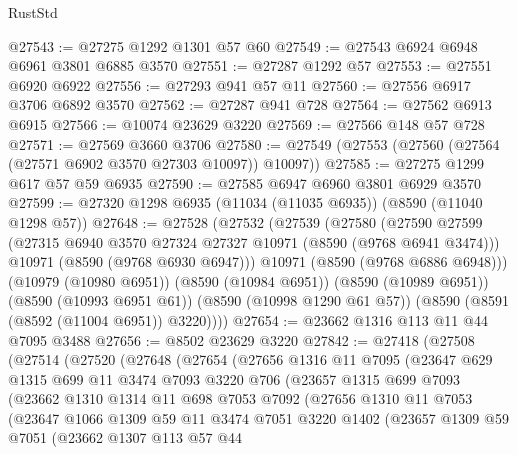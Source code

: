 \begin{lexlean}{RustStd}
\begin{coremodule}
@27543 := @27275 @1292 @1301 @57 @60
@27549 := @27543 @6924 @6948 @6961 @3801 @6885 @3570
@27551 := @27287 @1292 @57
@27553 := @27551 @6920 @6922
@27556 := @27293 @941 @57 @11
@27560 := @27556 @6917 @3706 @6892 @3570
@27562 := @27287 @941 @728
@27564 := @27562 @6913 @6915
@27566 := @10074 @23629 @3220
@27569 := @27566 @148 @57 @728
@27571 := @27569 @3660 @3706
@27580 := @27549 (@27553 (@27560 (@27564 (@27571 @6902 @3570 @27303 @10097)) @10097))
@27585 := @27275 @1299 @617 @57 @59 @6935
@27590 := @27585 @6947 @6960 @3801 @6929 @3570
@27599 := @27320 @1298 @6935 (@11034 (@11035 @6935)) (@8590 (@11040 @1298 @57))
@27648 := @27528
    (@27532
      (@27539
        (@27580
          (@27590
            @27599
            (@27315 @6940 @3570 @27324 @27327 @10971 (@8590 (@9768 @6941 @3474)))
            @10971
            (@8590 (@9768 @6930 @6947)))
          @10971
          (@8590 (@9768 @6886 @6948)))
        (@10979 (@10980 @6951))
        (@8590 (@10984 @6951))
        (@8590 (@10989 @6951))
        (@8590 (@10993 @6951 @61))
        (@8590 (@10998 @1290 @61 @57))
        (@8590 (@8591 (@8592 (@11004 @6951)) @3220))))
@27654 := @23662 @1316 @113 @11 @44 @7095 @3488
@27656 := @8502 @23629 @3220
@27842 := @27418
    (@27508
      (@27514
        (@27520
          (@27648
            (@27654
              (@27656
                @1316
                @11
                @7095
                (@23647
                  @629
                  @1315
                  @699
                  @11
                  @3474
                  @7093
                  @3220
                  @706
                  (@23657
                    @1315
                    @699
                    @7093
                    (@23662
                      @1310
                      @1314
                      @11
                      @698
                      @7053
                      @7092
                      (@27656
                        @1310
                        @11
                        @7053
                        (@23647
                          @1066
                          @1309
                          @59
                          @11
                          @3474
                          @7051
                          @3220
                          @1402
                          (@23657
                            @1309
                            @59
                            @7051
                            (@23662
                              @1307
                              @113
                              @57
                              @44

\end{coremodule}
\end{lexlean}
